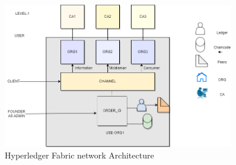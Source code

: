 \begin{figure}[htbp]
  \centering
  \includegraphics[width=0.9\textwidth]{Chapters/Chapter_5/figures/figure5_1.png}
  \caption{Hyperledger Fabric network Architecture }
  \label{fig:figure5_1}
  \end{figure}
